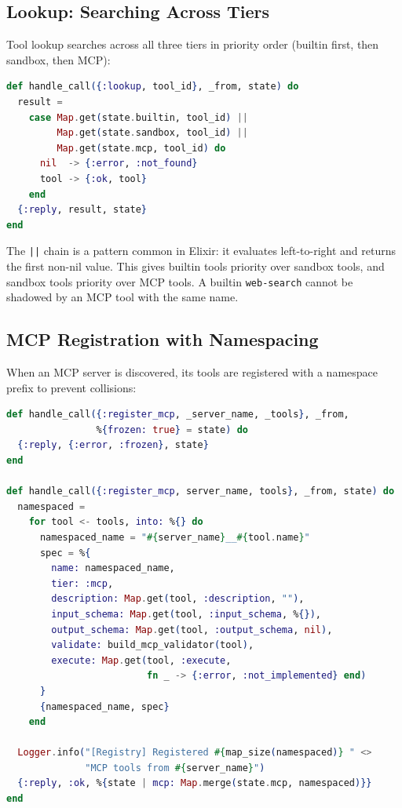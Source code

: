 \documentclass[12pt,a4paper]{article}
\theoremstyle{plain}
\theoremstyle{definition}
\begin{document}
\subsection{Lookup: Searching Across Tiers}

Tool lookup searches across all three tiers in priority order (builtin first, then sandbox, then MCP):

\begin{lstlisting}[language=elixir, caption={Tool lookup across tiers.}, label={lst:lookup}]
def handle_call({:lookup, tool_id}, _from, state) do
  result =
    case Map.get(state.builtin, tool_id) ||
         Map.get(state.sandbox, tool_id) ||
         Map.get(state.mcp, tool_id) do
      nil  -> {:error, :not_found}
      tool -> {:ok, tool}
    end
  {:reply, result, state}
end
\end{lstlisting}

The \texttt{||} chain is a pattern common in Elixir: it evaluates left-to-right and returns the first non-nil value. This gives builtin tools priority over sandbox tools, and sandbox tools priority over MCP tools. A builtin \texttt{web-search} cannot be shadowed by an MCP tool with the same name.

\subsection{MCP Registration with Namespacing}

When an MCP server is discovered, its tools are registered with a namespace prefix to prevent collisions:

\begin{lstlisting}[language=elixir, caption={MCP tool registration with namespace and freeze guard.}, label={lst:register-mcp}]
def handle_call({:register_mcp, _server_name, _tools}, _from,
                %{frozen: true} = state) do
  {:reply, {:error, :frozen}, state}
end

def handle_call({:register_mcp, server_name, tools}, _from, state) do
  namespaced =
    for tool <- tools, into: %{} do
      namespaced_name = "#{server_name}__#{tool.name}"
      spec = %{
        name: namespaced_name,
        tier: :mcp,
        description: Map.get(tool, :description, ""),
        input_schema: Map.get(tool, :input_schema, %{}),
        output_schema: Map.get(tool, :output_schema, nil),
        validate: build_mcp_validator(tool),
        execute: Map.get(tool, :execute,
                         fn _ -> {:error, :not_implemented} end)
      }
      {namespaced_name, spec}
    end

  Logger.info("[Registry] Registered #{map_size(namespaced)} " <>
              "MCP tools from #{server_name}")
  {:reply, :ok, %{state | mcp: Map.merge(state.mcp, namespaced)}}
end
\end{lstlisting}
\end{document}
